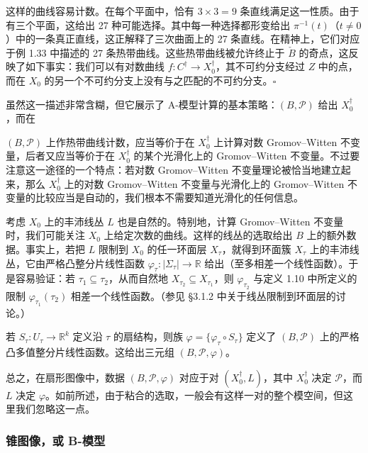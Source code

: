 \begin{example}
这样的曲线容易计数。在每个平面中，恰有 $3\times3=9$ 条直线满足这一性质。由于有三个平面，这给出 27 种可能选择。其中每一种选择都形变给出 $\pi^{-1}(t)$（$t\neq0$）中的一条真正直线，这正解释了三次曲面上的 27 条直线。在精神上，它们对应于例 1.33 中描述的 27 条热带曲线。这些热带曲线被允许终止于 $\check B$ 的奇点，这反映了如下事实：我们可以有对数曲线 $f:C^{\dagger}\to X_0^{\dagger}$，其不可约分支经过 $Z$ 中的点，而在 $X_0$ 的另一个不可约分支上没有与之匹配的不可约分支。\hfill$\square$

\end{example}

虽然这一描述非常含糊，但它展示了 A-模型计算的基本策略：$(B,\mathcal{P})$ 给出 $X_0^{\dagger}$，而在

$(B,\mathcal{P})$ 上作热带曲线计数，应当等价于在 $X_0^{\dagger}$ 上计算对数 Gromov–Witten 不变量，后者又应当等价于在 $X_0^{\dagger}$ 的某个光滑化上的 Gromov–Witten 不变量。不过要注意这一途径的一个特点：若对数 Gromov–Witten 不变量理论被恰当地建立起来，那么 $X_0^{\dagger}$ 上的对数 Gromov–Witten 不变量与光滑化上的 Gromov–Witten 不变量的比较应当是自动的，我们根本不需要知道光滑化的任何信息。

考虑 $X_0$ 上的丰沛线丛 $L$ 也是自然的。特别地，计算 Gromov–Witten 不变量时，我们可能关注 $X_0$ 上给定次数的曲线。这样的线丛的选取给出 $B$ 上的额外数据。事实上，若把 $L$ 限制到 $X_0$ 的任一环面层 $X_\tau$，就得到环面簇 $X_\tau$ 上的丰沛线丛，它由严格凸整分片线性函数 $\varphi_\tau:|\Sigma_\tau|\to\mathbb{R}$ 给出（至多相差一个线性函数）。于是容易验证：若 $\tau_1\subseteq\tau_2$，从而自然地 $X_{\tau_2}\subseteq X_{\tau_1}$，则 $\varphi_{\tau_2}$ 与定义 1.10 中所定义的限制 $\varphi_{\tau_1}(\tau_2)$ 相差一个线性函数。（参见 §3.1.2 中关于线丛限制到环面层的讨论。）

若 $S_\tau:U_\tau\to\mathbb{R}^k$ 定义沿 $\tau$ 的扇结构，则族 $\varphi=\{\varphi_\tau\circ S_\tau\}$ 定义了 $(B,\mathcal{P})$ 上的严格凸多值整分片线性函数。这给出三元组 $(B,\mathcal{P},\varphi)$。

总之，在扇形图像中，数据 $(B,\mathcal{P},\varphi)$ 对应于对 $(X_0^{\dagger},L)$，其中 $X_0^{\dagger}$ 决定 $\mathcal{P}$，而 $L$ 决定 $\varphi$。如前所述，由于粘合的选取，一般会有这样一对的整个模空间，但这里我们忽略这一点。

\subsubsection{锥图像，或 B-模型}

